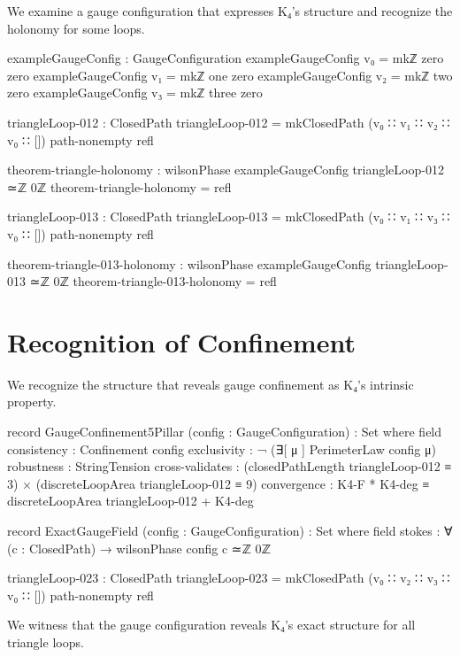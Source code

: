 \documentclass[11pt,a4paper]{book}
\begin{document}
We examine a gauge configuration that expresses K₄'s structure and recognize the holonomy for some loops.

\begin{code}
exampleGaugeConfig : GaugeConfiguration
exampleGaugeConfig v₀ = mkℤ zero zero
exampleGaugeConfig v₁ = mkℤ one zero
exampleGaugeConfig v₂ = mkℤ two zero
exampleGaugeConfig v₃ = mkℤ three zero

triangleLoop-012 : ClosedPath
triangleLoop-012 = mkClosedPath 
  (v₀ ∷ v₁ ∷ v₂ ∷ v₀ ∷ [])
  path-nonempty
  refl

theorem-triangle-holonomy : wilsonPhase exampleGaugeConfig triangleLoop-012 ≃ℤ 0ℤ
theorem-triangle-holonomy = refl

triangleLoop-013 : ClosedPath
triangleLoop-013 = mkClosedPath 
  (v₀ ∷ v₁ ∷ v₃ ∷ v₀ ∷ [])
  path-nonempty
  refl

theorem-triangle-013-holonomy : wilsonPhase exampleGaugeConfig triangleLoop-013 ≃ℤ 0ℤ
theorem-triangle-013-holonomy = refl
\end{code}

\section{Recognition of Confinement}

We recognize the structure that reveals gauge confinement as K₄'s intrinsic property.

\begin{code}
record GaugeConfinement5Pillar (config : GaugeConfiguration) : Set where
  field
    consistency     : Confinement config
    exclusivity     : ¬ (∃[ μ ] PerimeterLaw config μ)
    robustness      : StringTension
    cross-validates : (closedPathLength triangleLoop-012 ≡ 3) × (discreteLoopArea triangleLoop-012 ≡ 9)
    convergence     : K4-F * K4-deg ≡ discreteLoopArea triangleLoop-012 + K4-deg

record ExactGaugeField (config : GaugeConfiguration) : Set where
  field
    stokes : ∀ (c : ClosedPath) → wilsonPhase config c ≃ℤ 0ℤ

triangleLoop-023 : ClosedPath
triangleLoop-023 = mkClosedPath 
  (v₀ ∷ v₂ ∷ v₃ ∷ v₀ ∷ [])
  path-nonempty
  refl
\end{code}

We witness that the gauge configuration reveals K₄'s exact structure for all triangle loops.
\end{document}
